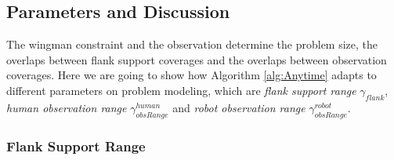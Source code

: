 \subsection{Parameters and Discussion}
\label{subsec:parameters_and_discussion}

The wingman constraint and the observation determine the problem size, the overlaps between flank support coverages and the overlaps between observation coverages.
Here we are going to show how Algorithm \ref{alg:Anytime} adapts to different parameters on problem modeling, which are \emph{flank support range} $ \gamma_{flank} $, \emph{human observation range} $ \gamma^{human}_{obsRange} $  and \emph{robot observation range} $ \gamma^{robot}_{obsRange} $.

\subsubsection{Flank Support Range}
\label{subsubsec:flank_support_range}

